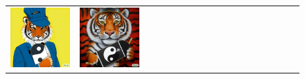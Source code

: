 \begin{figure}[ht!]
\begin{adjustwidth}{-0.8in}{-0.5in}
\begin{tabular}{cccccccccccccccccccc}
\multicolumn{2}{c}{\includegraphics[width=\threebythreecolwidth\textwidth]{figures/cherries/tiger2.jpg}} &
\multicolumn{2}{c}{\includegraphics[width=\threebythreecolwidth\textwidth]{figures/cherries/tiger3.jpg}} &&


\end{tabular}
\end{adjustwidth}
\end{figure}
